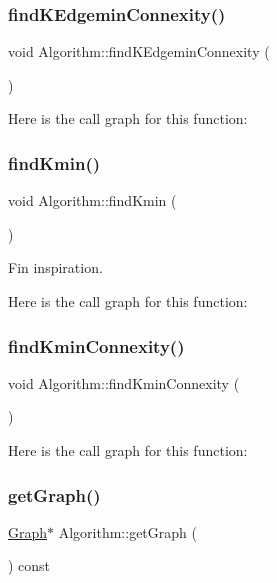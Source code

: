 \subsubsection{\texorpdfstring{find\+K\+Edgemin\+Connexity()}{findKEdgeminConnexity()}}
{\footnotesize\ttfamily void Algorithm\+::find\+K\+Edgemin\+Connexity (\begin{DoxyParamCaption}{ }\end{DoxyParamCaption})}

Here is the call graph for this function\+:
\mbox{\label{struct_algorithm_a83933a235de08f4eb72485921a2c576c}} 
\subsubsection{\texorpdfstring{find\+Kmin()}{findKmin()}}
{\footnotesize\ttfamily void Algorithm\+::find\+Kmin (\begin{DoxyParamCaption}{ }\end{DoxyParamCaption})}



Fin inspiration. 

Here is the call graph for this function\+:
\mbox{\label{struct_algorithm_a022765d843f892f00785c473813b2b77}} 
\subsubsection{\texorpdfstring{find\+Kmin\+Connexity()}{findKminConnexity()}}
{\footnotesize\ttfamily void Algorithm\+::find\+Kmin\+Connexity (\begin{DoxyParamCaption}{ }\end{DoxyParamCaption})}

Here is the call graph for this function\+:
\mbox{\label{struct_algorithm_a9589dba6e57847783c9ef56891e0346b}} 
\subsubsection{\texorpdfstring{get\+Graph()}{getGraph()}}
{\footnotesize\ttfamily \mbox{\hyperlink{class_graph}{Graph}}$\ast$ Algorithm\+::get\+Graph (\begin{DoxyParamCaption}{ }\end{DoxyParamCaption}) const\hspace{0.3cm}{\ttfamily [inline]}}

